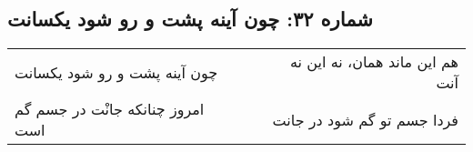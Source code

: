 \begin{center}
\section*{شماره ۳۲: چون آینه پشت و رو شود یکسانت}
\label{sec:032}
\begin{longtable}{l p{0.5cm} r}
چون آینه پشت و رو شود یکسانت
&&
هم این ماند همان، نه این نه آنت
\\
امروز چنانکه جانْت در جسم گم است
&&
فردا جسم تو گم شود در جانت
\\
\end{longtable}
\end{center}

